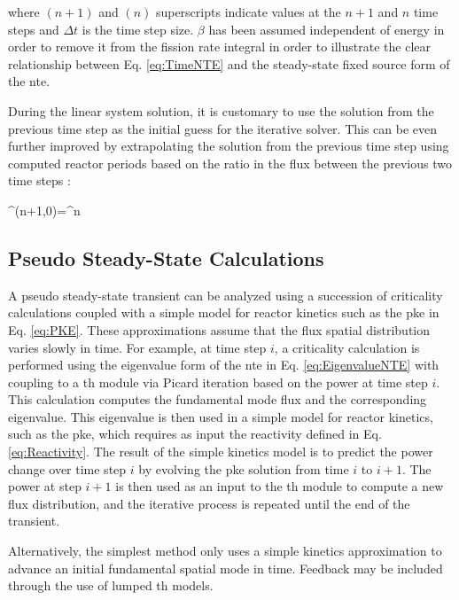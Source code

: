 where \((n+1)\) and \((n)\) superscripts indicate values at the \(n+1\) and \(n\) time steps and \(\Delta t\) is the time step size. \(\beta\) has been assumed independent of energy in order to remove it from the fission rate integral in order to illustrate the clear relationship between Eq. \eqref{eq:TimeNTE} and the steady-state fixed source form of the \gls{nte}. 

During the linear system solution, it is customary to use the solution from the previous time step as the initial guess for the iterative solver. This can be even further improved by extrapolating the solution from the previous time step using computed reactor periods based on the ratio in the flux between the previous two time steps \cite{pautz}:

\beq
\psi^{(n+1,0)}=\psi^{n}
\eeq

\subsection{Pseudo Steady-State Calculations}
\label{sec:PseudoSteadyState}

A pseudo steady-state transient can be analyzed using a succession of criticality calculations coupled with a simple model for reactor kinetics such as the \gls{pke} in Eq. \eqref{eq:PKE}. These approximations assume that the flux spatial distribution varies slowly in time. For example, at time step \(i\), a criticality calculation is performed using the eigenvalue form of the \gls{nte} in Eq. \eqref{eq:EigenvalueNTE} with coupling to a \gls{th} module via Picard iteration based on the power at time step \(i\). This calculation computes the fundamental mode flux and the corresponding eigenvalue. This eigenvalue is then used in a simple model for reactor kinetics, such as the \gls{pke}, which requires as input the reactivity defined in Eq. \eqref{eq:Reactivity}. The result of the simple kinetics model is to predict the power change over time step \(i\) by evolving the \gls{pke} solution from time \(i\) to \(i+1\). The power at step \(i+1\) is then used as an input to the \gls{th} module to compute a new flux distribution, and the iterative process is repeated until the end of the transient.

Alternatively, the simplest method only uses a simple kinetics approximation to advance an initial fundamental spatial mode in time. Feedback may be included through the use of lumped \gls{th} models. 

